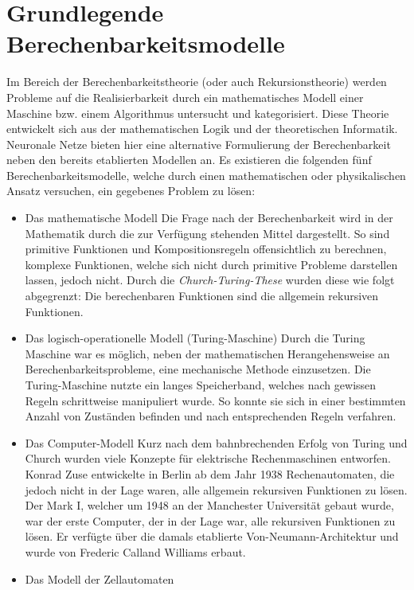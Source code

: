 \section{Grundlegende Berechenbarkeitsmodelle}
\label{sec:neuro_models}
	Im Bereich der Berechenbarkeitstheorie (oder auch Rekursionstheorie) werden Probleme auf die Realisierbarkeit durch ein mathematisches Modell einer Maschine bzw. einem Algorithmus untersucht und kategorisiert. Diese Theorie entwickelt sich aus der mathematischen Logik und der theoretischen Informatik. Neuronale Netze bieten hier eine alternative Formulierung der Berechenbarkeit neben den bereits etablierten Modellen an. Es existieren die folgenden fünf Berechenbarkeitsmodelle, welche durch einen mathematischen oder physikalischen Ansatz versuchen, ein gegebenes Problem zu lösen:
	\begin{itemize}
		\item Das mathematische Modell
			\subitem Die Frage nach der Berechenbarkeit wird in der Mathematik durch die zur Verfügung stehenden Mittel dargestellt. So sind primitive Funktionen und Kompositionsregeln offensichtlich zu berechnen, komplexe Funktionen, welche sich nicht durch primitive Probleme darstellen lassen, jedoch nicht. Durch die \textit{Church-Turing-These} \cite{Turing1936} wurden diese wie folgt abgegrenzt: \glqq Die berechenbaren Funktionen sind die allgemein rekursiven Funktionen.\grqq
			\newpage
		\item Das logisch-operationelle Modell (Turing-Maschine)
			\subitem Durch die Turing Maschine \cite{Turing1936} war es möglich, neben der mathematischen Herangehensweise an Berechenbarkeitsprobleme, eine mechanische Methode einzusetzen. Die Turing-Maschine nutzte ein langes Speicherband, welches nach gewissen Regeln schrittweise manipuliert wurde. So konnte sie sich in einer bestimmten Anzahl von Zuständen befinden und nach entsprechenden Regeln verfahren.
		\item Das Computer-Modell
			\subitem Kurz nach dem bahnbrechenden Erfolg von Turing und Church wurden viele Konzepte für elektrische Rechenmaschinen entworfen. Konrad Zuse entwickelte in Berlin ab dem Jahr 1938 Rechenautomaten, die jedoch nicht in der Lage waren, alle allgemein rekursiven Funktionen zu lösen. Der Mark I, welcher um 1948 an der Manchester Universität gebaut wurde, war der erste Computer, der in der Lage war, alle rekursiven Funktionen zu lösen. Er verfügte über die damals etablierte Von-Neumann-Architektur \cite{Neumann1945} und wurde von Frederic Calland Williams erbaut.
		\item Das Modell der Zellautomaten

\end{itemize}
